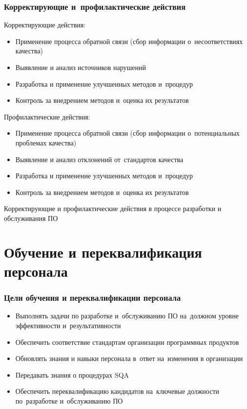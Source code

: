 \documentclass{../industrial-development}
\begin{document}
\begin{frame} \frametitle{Корректирующие и~профилактические действия}
Корректирующие действия:
 	 \begin{itemize}
\item\small Применение процесса обратной связи (сбор информации о~несоответствиях качества)
\item\small Выявление и анализ источников нарушений
\item\small Разработка и применение улучшенных методов и~процедур
\item\small Контроль за внедрением методов и~оценка их результатов
  	\end{itemize}
Профилактические действия:
 	 \begin{itemize}
\item\small Применение процесса обратной связи (сбор информации о~потенциальных проблемах качества)
\item\small Выявление и анализ отклонений от~стандартов качества
\item\small Разработка и применение улучшенных методов и~процедур
\item\small Контроль за внедрением методов и~оценка их результатов
  	\end{itemize}
\end{frame}

\lecturenotes

Корректирующие и профилактические действия в процессе разработки и обслуживания ПО~\cite[с.~351]{SQA-Galin}




\section{Обучение и переквалификация персонала}
\begin{frame} \frametitle{Цели обучения и переквалификации персонала}
 	 \begin{itemize}
\item Выполнять задачи по разработке и~обслуживанию ПО на~должном уровне эффективности и~результативности
\item Обеспечить соответствие стандартам организации программных продуктов
\item Обновлять знания и навыки персонала в~ответ на~изменения в организации
\item Передавать знания о процедурах SQA
\item Обеспечить переквалификацию кандидатов на~ключевые должности по~разработке и~обслуживанию ПО
  	\end{itemize}
\end{frame}
\end{document}
